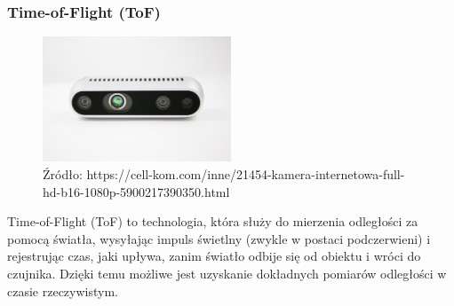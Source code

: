 \documentclass[magisterska]{pracadypl}
\begin{document}
\subsubsection{Time-of-Flight (ToF)}

\begin{figure}[h]  %
    \centering  %
    \includegraphics[width=0.5\textwidth]{images/TOF-IR.jpg}  %
    \captionsetup{labelformat=empty, font=footnotesize}
    \caption{Źródło: https://cell-kom.com/inne/21454-kamera-internetowa-full-hd-b16-1080p-5900217390350.html}
    \label{fig:mono}  %
\end{figure}

Time-of-Flight (ToF) to technologia, która służy do mierzenia odległości za pomocą światła, wysyłając impuls świetlny (zwykle w postaci podczerwieni) i rejestrując czas, jaki upływa, zanim światło odbije się od obiektu i wróci do czujnika. Dzięki temu możliwe jest uzyskanie dokładnych pomiarów odległości w czasie rzeczywistym.
\end{document}
